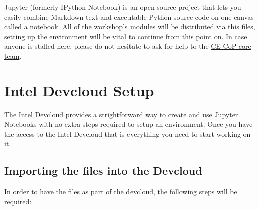 \documentclass{assignment}
\begin{document}






Jupyter (formerly IPython Notebook) is an open-source project that lets you easily combine Markdown text and executable Python source code on one canvas called a notebook. All of the workshop's modules will be distributed via this files, setting up the environment will be vital to continue from this point on. In case anyone is stalled here, please do not hesitate to ask for help to the \href{mailto:computer.eng.cop.core.team@intel.com}{CE CoP core team}.

\section{Intel Devcloud Setup}

The Intel Devcloud provides a strightforward way to create and use Jupyter Notebooks with no extra steps required to setup an environment. Once you have the access to the Intel Devcloud that is everything you need to start working on it.

\subsection{Importing the files into the Devcloud}

In order to have the files as part of the devcloud, the following steps will be required:
\end{document}
